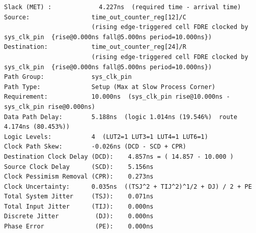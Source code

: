 \documentclass{report}
\newenvironment{narrowmargins}{
    \begin{adjustwidth}{-0.75in}{0.25in} %
}{
    \end{adjustwidth}
}
\begin{document}
\begin{narrowmargins}
\begin{verbatim}
Slack (MET) :             4.227ns  (required time - arrival time)
Source:                 time_out_counter_reg[12]/C
                        (rising edge-triggered cell FDRE clocked by sys_clk_pin  {rise@0.000ns fall@5.000ns period=10.000ns})
Destination:            time_out_counter_reg[24]/R
                        (rising edge-triggered cell FDRE clocked by sys_clk_pin  {rise@0.000ns fall@5.000ns period=10.000ns})
Path Group:             sys_clk_pin
Path Type:              Setup (Max at Slow Process Corner)
Requirement:            10.000ns  (sys_clk_pin rise@10.000ns - sys_clk_pin rise@0.000ns)
Data Path Delay:        5.188ns  (logic 1.014ns (19.546%)  route 4.174ns (80.453%))
Logic Levels:           4  (LUT2=1 LUT3=1 LUT4=1 LUT6=1)
Clock Path Skew:        -0.026ns (DCD - SCD + CPR)
Destination Clock Delay (DCD):    4.857ns = ( 14.857 - 10.000 ) 
Source Clock Delay      (SCD):    5.156ns
Clock Pessimism Removal (CPR):    0.273ns
Clock Uncertainty:      0.035ns  ((TSJ^2 + TIJ^2)^1/2 + DJ) / 2 + PE
Total System Jitter     (TSJ):    0.071ns
Total Input Jitter      (TIJ):    0.000ns
Discrete Jitter          (DJ):    0.000ns
Phase Error              (PE):    0.000ns


\end{verbatim}
\end{narrowmargins}
\end{document}
